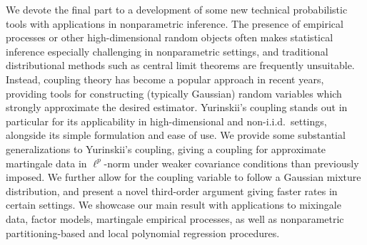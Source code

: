 We devote the final part to a development of some new technical
probabilistic tools with applications in nonparametric inference.
The presence of empirical processes or other high-dimensional random
objects often makes statistical inference especially challenging
in nonparametric settings, and traditional distributional methods
such as central limit theorems are frequently unsuitable.
Instead, coupling theory has become a popular approach in recent years,
providing tools for constructing (typically Gaussian) random variables
which strongly approximate the desired estimator.
Yurinskii's coupling stands out in particular
for its applicability in high-dimensional and non-i.i.d.\ settings,
alongside its simple formulation and ease of use.
We provide some substantial generalizations to Yurinskii's
coupling, giving a coupling for approximate martingale data in
$\ell^p$-norm under weaker covariance conditions than previously imposed.
We further allow for the coupling variable to follow a Gaussian mixture
distribution, and present a novel third-order argument giving faster
rates in certain settings. We showcase our main result with applications
to mixingale data, factor models, martingale empirical processes,
as well as nonparametric partitioning-based and local polynomial
regression procedures.

